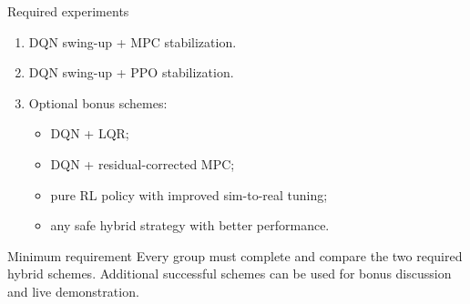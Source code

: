 \documentclass[aspectratio=169]{beamer}
\begin{document}
\begin{frame}{Required experiments}

\begin{enumerate}
    \item DQN swing-up + MPC stabilization.
    \vspace{0.25cm}

    \item DQN swing-up + PPO stabilization.
    \vspace{0.25cm}

    \item Optional bonus schemes:
    \begin{itemize}
        \item DQN + LQR;
        \item DQN + residual-corrected MPC;
        \item pure RL policy with improved sim-to-real tuning;
        \item any safe hybrid strategy with better performance.
    \end{itemize}
\end{enumerate}

\vspace{0.15cm}

\begin{block}{Minimum requirement}
\small
Every group must complete and compare the two required hybrid schemes.
Additional successful schemes can be used for bonus discussion and live demonstration.
\end{block}

\end{frame}

\end{document}
